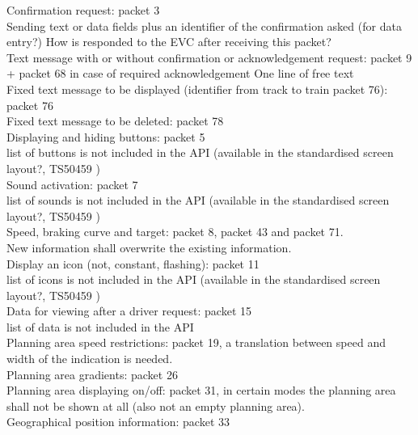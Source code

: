 \documentclass{template/openetcs_report}
\begin{document}
Confirmation request: packet 3\\
Sending text or data fields plus an identifier of the confirmation asked (for data entry?)
How is responded to the EVC after receiving this packet?\\

Text message with or without confirmation or acknowledgement request: packet 9 + packet 68 in case of required acknowledgement
{One line of free text}\\

Fixed text message to be displayed (identifier from track to train packet 76): packet 76\\
Fixed text message to be deleted: packet 78\\

Displaying and hiding buttons: packet 5	\\
list of buttons is not included in the API (available in the standardised screen layout?, TS50459 )\\

Sound activation: packet 7\\
list of sounds is not included in the API (available in the standardised screen layout?, TS50459 )\\

Speed, braking curve and target: packet 8, packet 43 and packet 71.\\
New information shall overwrite the existing information.\\

Display an icon (not, constant, flashing): packet 11\\
list of icons is not included in the API (available in the standardised screen layout?, TS50459 )\\
Data for viewing after a driver request: packet 15\\
list of data is not included in the API\\

Planning area speed restrictions: packet 19, a translation between speed and width of the indication is needed.\\

Planning area gradients: packet 26\\

Planning area displaying on/off: packet 31,  in certain modes the planning area shall not be shown at all (also not an empty planning area).\\

Geographical position information:  packet 33\\
\end{document}
